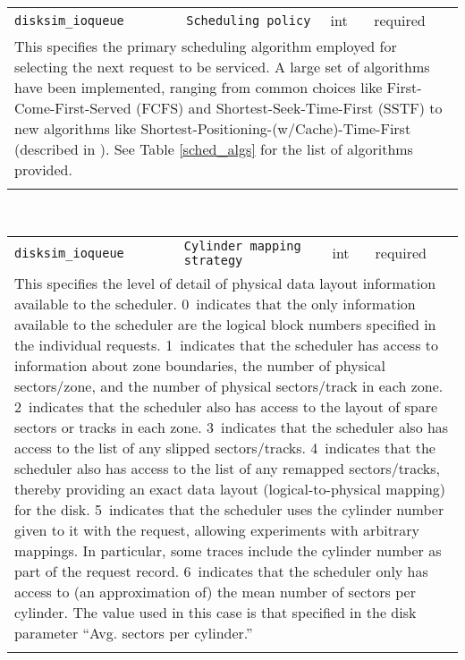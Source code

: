 \noindent 
\begin{tabular}{|p{1.5in}|p{3.5in}|p{0.5in}|p{0.5in}|}
\cline{1-4}
\texttt{disksim\_ioqueue} & \texttt{Scheduling policy} & int & required \\ 
\cline{1-4}
\multicolumn{4}{|p{6in}|}{
This specifies the primary scheduling algorithm employed for selecting
the next request to be serviced. A large set of algorithms have been
implemented, ranging from common choices like First-Come-First-Served
(FCFS) and Shortest-Seek-Time-First (SSTF) to new algorithms like
Shortest-Positioning-(w/Cache)-Time-First (described in
\cite{Worthington94}). See Table \ref{sched_algs} for the list of
algorithms provided.
}\\ 
\cline{1-4}
\multicolumn{4}{p{5in}}{}\\
\end{tabular}\\ 
\noindent 
\begin{tabular}{|p{1.5in}|p{3.5in}|p{0.5in}|p{0.5in}|}
\cline{1-4}
\texttt{disksim\_ioqueue} & \texttt{Cylinder mapping strategy} & int & required \\ 
\cline{1-4}
\multicolumn{4}{|p{6in}|}{
This specifies the level of detail of physical data layout information
available to the scheduler.
0~indicates that the only information available to the scheduler are
the logical block numbers specified in the individual requests.
1~indicates that the scheduler has access to information about zone
boundaries, the number of physical sectors/zone, and the number of
physical sectors/track in each zone.
2~indicates that the scheduler also has access to the layout of spare
sectors or tracks in each zone.
3~indicates that the scheduler also has access to the list of any
slipped sectors/tracks.
4~indicates that the scheduler also has access to the list of any
remapped sectors/tracks, thereby providing an exact data layout
(logical-to-physical mapping) for the disk.
5~indicates that the scheduler uses the cylinder number given to it
with the request, allowing experiments with arbitrary mappings. In
particular, some traces include the cylinder number as part of the
request record.
6~indicates that the scheduler only has access to (an approximation
of) the mean number of sectors per cylinder. The value used in this
case is that specified in the disk parameter ``Avg. sectors per
cylinder.''
}\\ 
\cline{1-4}
\multicolumn{4}{p{5in}}{}\\
\end{tabular}\\ 
